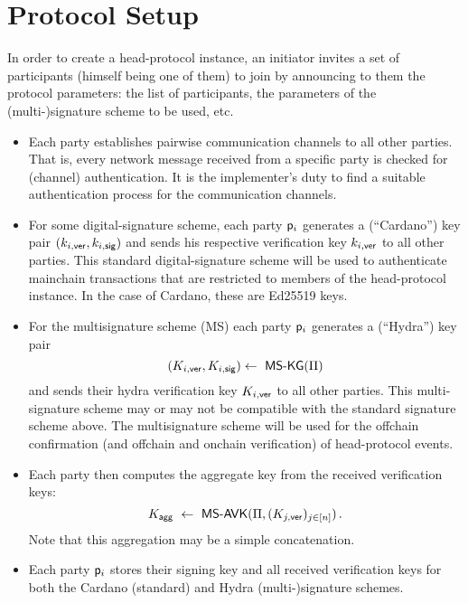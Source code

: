 
\section{Protocol Setup}\label{sec:hpsetup}
In order to create a head-protocol instance, an initiator invites a set of
participants (himself being one of them) to join by announcing to them the
protocol parameters: the list of participants, the parameters of the
(multi-)signature scheme to be used, etc.

\begin{itemize}
  \item Each party establishes pairwise communication channels to all other parties. That is, every network message received from a specific party is checked for (channel) authentication. It is the implementer’s duty to find a suitable authentication process for the communication channels.

  \item For some digital-signature scheme, each party $\mathsf p_i$ generates a
        (``Cardano'') key pair $(k_{i,\mathsf{ver}},k_{i,\mathsf{sig}})$ and sends his respective
        verification key $k_{i,\mathsf{ver}}$ to all other parties. This standard
        digital-signature scheme will be used to authenticate mainchain
        transactions that are restricted to members of the head-protocol
        instance. In the case of Cardano, these are Ed25519 keys.

  \item For the multisignature scheme (MS) 
        each party $\mathsf p_i$ generates a (``Hydra'') key pair
        \[
          (\daPuI{i},\daPrI{i})  \gets \ \msKeyGen(\msParams)
        \]
        and sends their hydra verification key $K_{i,\mathsf{ver}}$ to all other parties. This
        multi-signature scheme may or may not be compatible with the standard
        signature scheme above. The multisignature scheme will be used for the
        offchain confirmation (and offchain and onchain verification) of
        head-protocol events.

  \item Each party then computes the aggregate key from the received
        verification keys:
        \[
          \hpAK \ \gets \ \msCombVK(\msParams,(\daPuI{j})_{j\in[n]}) \,.
        \]
        Note that this aggregation may be a simple concatenation.

  \item Each party $\mathsf p_i$ stores their signing key and all received
        verification keys for both the Cardano (standard) and Hydra
        (multi-)signature schemes.
\end{itemize}

